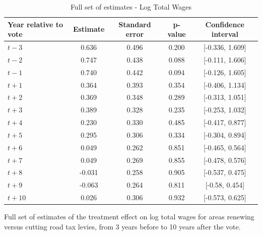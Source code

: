 \begin{table}[htbp]
    \centering
    \caption{Full set of estimates - Log Total Wages}
    \label{tab:log_total_wages}
    \begin{tabular}{p{3cm}cccc}
        \hline
        Year relative to vote & Estimate & Standard error & p-value & Confidence interval \\
        \hline
        $t - 3$  & 0.636  & 0.496  & 0.200  & [-0.336, 1.609] \\
        $t - 2$  & 0.747  & 0.438  & 0.088  & [-0.111, 1.606] \\
        $t - 1$  & 0.740  & 0.442  & 0.094  & [-0.126, 1.605] \\
        $t + 1$ & 0.364  & 0.393  & 0.354  & [-0.406, 1.134] \\
        $t + 2$ & 0.369  & 0.348  & 0.289  & [-0.313, 1.051] \\
        $t + 3$ & 0.389  & 0.328  & 0.235  & [-0.253, 1.032] \\
        $t + 4$ & 0.230  & 0.330  & 0.485  & [-0.417, 0.877] \\
        $t + 5$ & 0.295  & 0.306  & 0.334  & [-0.304, 0.894] \\
        $t + 6$ & 0.049  & 0.262  & 0.851  & [-0.465, 0.564] \\
        $t + 7$ & 0.049  & 0.269  & 0.855  & [-0.478, 0.576] \\
        $t + 8$ & -0.031 & 0.258  & 0.905  & [-0.537, 0.475] \\
        $t + 9$ & -0.063 & 0.264  & 0.811  & [-0.58, 0.454] \\
        $t + 10$ & 0.026  & 0.306  & 0.932  & [-0.573, 0.625] \\
        \hline
    \end{tabular}
    \begin{tablenotes}
        \small
        \item Full set of estimates of the treatment effect on log total wages for areas renewing versus cutting road tax levies, from 3 years before to 10 years after the vote.
    \end{tablenotes}
\end{table}

